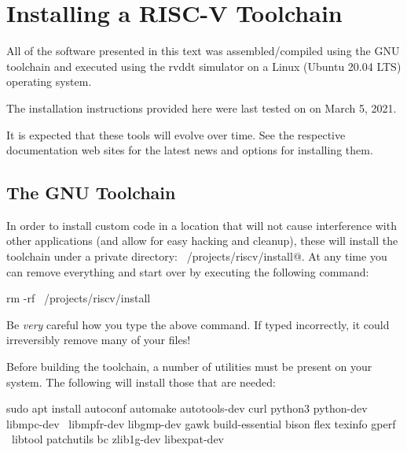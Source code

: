 \chapter{Installing a RISC-V Toolchain}
\label{chapter:install}

All of the software presented in this text was assembled/compiled 
using the GNU toolchain and executed using the rvddt simulator on 
a Linux (Ubuntu 20.04 LTS) operating system.

The installation instructions provided here were last tested on 
on March 5, 2021.

It is expected that these tools will evolve over time.  See the
respective documentation web sites for the latest news and options
for installing them.

\section{The GNU Toolchain}

%
In order to install custom code in a location that will not cause 
interference with other applications (and allow for easy hacking and
cleanup), these will install the toolchain under
a private directory: \verb@~/projects/riscv/install@.  At any time
you can remove everything and start over by executing the following 
command:

\begin{tty}
rm -rf ~/projects/riscv/install
\end{tty}

\begin{tcolorbox}
Be {\em very} careful how you type the above \verb@rm@ command.  
If typed incorrectly, it could irreversibly remove many of your files!
\end{tcolorbox}

Before building the toolchain, a number of utilities must be present on 
your system.  The following will install those that are needed:

\begin{minipage}{\textwidth}
\begin{tty}
sudo apt install autoconf automake autotools-dev curl python3 python-dev libmpc-dev \
    libmpfr-dev libgmp-dev gawk build-essential bison flex texinfo gperf \
    libtool patchutils bc zlib1g-dev libexpat-dev
\end{tty}
\end{minipage}

